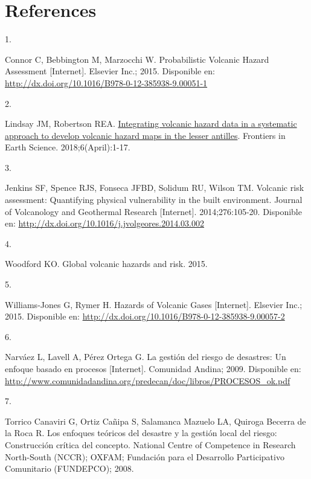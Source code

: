 \documentclass[
  spanish,
  letterpaper,
]{book}
\newlength{\cslhangindent}
\newlength{\csllabelwidth}
\newenvironment{CSLReferences}[2] %
 {\begin{list}{}{%
  \setlength{\itemindent}{0pt}
  \setlength{\leftmargin}{0pt}
  \setlength{\parsep}{0pt}
  \ifodd #1
   \setlength{\leftmargin}{\cslhangindent}
   \setlength{\itemindent}{-1\cslhangindent}
  \fi
  \setlength{\itemsep}{#2\baselineskip}}}
 {\end{list}}
\newcommand{\CSLLeftMargin}[1]{\parbox[t]{\csllabelwidth}{\strut#1\strut}}
\newcommand{\CSLRightInline}[1]{\parbox[t]{\linewidth - \csllabelwidth}{\strut#1\strut}}
\begin{document}

\chapter*{References}\label{references}


\label{refs}
\begin{CSLReferences}{0}{1}
\CSLLeftMargin{1. }%
\CSLRightInline{Connor C, Bebbington M, Marzocchi W. Probabilistic
Volcanic Hazard Assessment {[}Internet{]}. Elsevier Inc.; 2015.
Disponible en:
\url{http://dx.doi.org/10.1016/B978-0-12-385938-9.00051-1}}

\CSLLeftMargin{2. }%
\CSLRightInline{Lindsay JM, Robertson REA.
\href{https://doi.org/10.3389/feart.2018.00042}{Integrating volcanic
hazard data in a systematic approach to develop volcanic hazard maps in
the lesser antilles}. Frontiers in Earth Science. 2018;6(April):1-17. }

\CSLLeftMargin{3. }%
\CSLRightInline{Jenkins SF, Spence RJS, Fonseca JFBD, Solidum RU, Wilson
TM. Volcanic risk assessment: Quantifying physical vulnerability in the
built environment. Journal of Volcanology and Geothermal Research
{[}Internet{]}. 2014;276:105-20. Disponible en:
\url{http://dx.doi.org/10.1016/j.jvolgeores.2014.03.002}}

\CSLLeftMargin{4. }%
\CSLRightInline{Woodford KO. Global volcanic hazards and risk. 2015. }

\CSLLeftMargin{5. }%
\CSLRightInline{Williams-Jones G, Rymer H. Hazards of Volcanic Gases
{[}Internet{]}. Elsevier Inc.; 2015. Disponible en:
\url{http://dx.doi.org/10.1016/B978-0-12-385938-9.00057-2}}

\CSLLeftMargin{6. }%
\CSLRightInline{Narváez L, Lavell A, Pérez Ortega G. La gestión del
riesgo de desastres: Un enfoque basado en procesos {[}Internet{]}.
Comunidad Andina; 2009. Disponible en:
\url{http://www.comunidadandina.org/predecan/doc/libros/PROCESOS_ok.pdf}}

\CSLLeftMargin{7. }%
\CSLRightInline{Torrico Canaviri G, Ortiz Cañipa S, Salamanca Mazuelo
LA, Quiroga Becerra de la Roca R. Los enfoques teóricos del desastre y
la gestión local del riesgo: Construcción crítica del concepto. National
Centre of Competence in Research North-South (NCCR); OXFAM; Fundación
para el Desarrollo Participativo Comunitario (FUNDEPCO); 2008. }


\end{CSLReferences}
\end{document}
